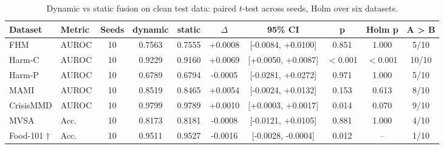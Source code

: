 \begin{table}[t]
\centering
\caption{Dynamic vs static fusion on clean test data: paired $t$-test across seeds, Holm over six datasets.}
\label{tab:significance}
\begin{tabular}{llcccccccc}
\toprule
Dataset & Metric & Seeds & dynamic & static & $\Delta$ & 95\% CI & p & Holm p & A > B \\
\midrule
FHM & AUROC & 10 & 0.7563 & 0.7555 & +0.0008 & [-0.0084, +0.0100] & 0.851 & 1.000 & 5/10 \\
Harm-C & AUROC & 10 & 0.9229 & 0.9160 & +0.0069 & [+0.0050, +0.0087] & $<$0.001 & $<$0.001 & 10/10 \\
Harm-P & AUROC & 10 & 0.6789 & 0.6794 & -0.0005 & [-0.0281, +0.0272] & 0.971 & 1.000 & 5/10 \\
MAMI & AUROC & 10 & 0.8519 & 0.8465 & +0.0054 & [-0.0024, +0.0132] & 0.153 & 0.613 & 8/10 \\
CrisisMMD & AUROC & 10 & 0.9799 & 0.9789 & +0.0010 & [+0.0003, +0.0017] & 0.014 & 0.070 & 9/10 \\
MVSA & Acc. & 10 & 0.8173 & 0.8181 & -0.0008 & [-0.0121, +0.0105] & 0.881 & 1.000 & 4/10 \\
Food-101 † & Acc. & 10 & 0.9511 & 0.9527 & -0.0016 & [-0.0028, -0.0004] & 0.012 & – & 1/10 \\
\bottomrule
\end{tabular}
\end{table}
